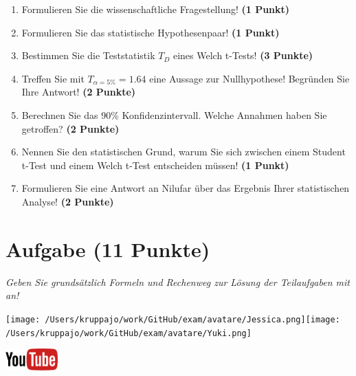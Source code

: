 \documentclass[a4paper, 9pt]{scrartcl}\usepackage[]{graphicx}\usepackage[]{xcolor}
\begin{document}
\begin{enumerate}
  \item Formulieren Sie die wissenschaftliche Fragestellung! \textbf{(1 Punkt)}
  \item Formulieren Sie das statistische Hypothesenpaar! \textbf{(1 Punkt)}
  \item Bestimmen Sie die Teststatistik $T_{D}$ eines  Welch t-Tests! \textbf{(3 Punkte)}
  \item Treffen Sie mit $T_{\alpha = 5\%} = 1.64$ eine Aussage zur Nullhypothese! Begründen Sie Ihre Antwort! \textbf{(2 Punkte)}
\item Berechnen Sie das 90\% Konfidenzintervall. Welche Annahmen haben Sie getroffen? \textbf{(2 Punkte)}
\item Nennen Sie den statistischen Grund, warum Sie sich zwischen einem Student t-Test und einem Welch t-Test entscheiden müssen! \textbf{(1 Punkt)}
\item Formulieren Sie eine Antwort an Nilufar über das Ergebnis Ihrer statistischen Analyse! \textbf{(2 Punkte)}
\end{enumerate} 
\clearpage

\section{Aufgabe \hfill (11 Punkte)}

\textit{Geben Sie grundsätzlich Formeln und Rechenweg zur Lösung der Teilaufgaben mit an!} \\[1Ex]
 

 
\begin{minipage}[t]{0.5\textwidth}
\texttt{[image: /Users/kruppajo/work/GitHub/exam/avatare/Jessica.png]}\hspace{-4mm}\texttt{[image: /Users/kruppajo/work/GitHub/exam/avatare/Yuki.png]}
\end{minipage}
\begin{minipage}[t]{0.5\textwidth}
\hfill
\href{https://youtu.be/QR90zyn0Iz8}{\includegraphics[width = 2cm]{img/youtube}}
\end{minipage}
\vspace{1ex}
\end{document}
